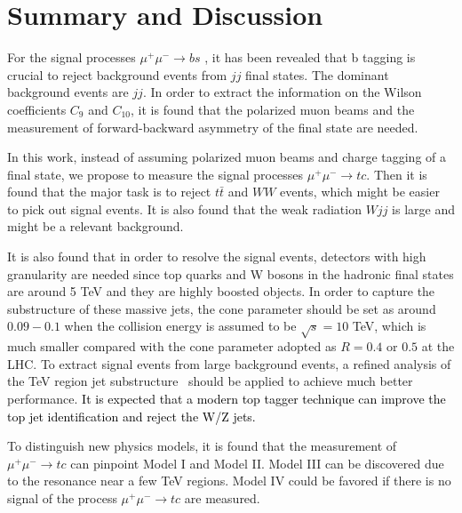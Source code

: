 \documentclass[a4paper,11pt]{article}
\begin{document}
\section{Summary and Discussion}\label{Sec:conc}
For the signal processes $\mu^+ \mu^- \to b s$ \cite{Altmannshofer:2022xri}, it has been revealed that b tagging is crucial to reject background events from $jj$ final states. The dominant background events are $j j$. In order to extract the information on the Wilson coefficients $C_{9}$ and $C_{10}$, it is found that the polarized muon beams and the measurement of forward-backward asymmetry of the final state are needed. 

In this work, instead of assuming polarized muon beams and charge tagging of a final state, we propose to measure the signal processes $\mu^+ \mu^- \to t c$. Then it is found that the major task is to reject $t \bar{t}$ and $ W W$ events, which might be easier to pick out signal events. It is also found that the weak radiation $W j j $ is large and might be a relevant background.

It is also found that in order to resolve the signal events, 
detectors with high granularity are needed since top quarks and W bosons in the hadronic final states are around 5 TeV and they are highly boosted objects. 
In order to capture the substructure of these massive jets, 
the cone parameter should be set as around  $0.09-0.1$ when the collision energy is assumed to be $\sqrt{s}=10$ TeV, 
which is much smaller compared with the cone parameter adopted as $R=0.4$ or $0.5$ at the LHC. 
To extract signal events from large background events, 
a refined analysis of the TeV region jet substructure~\cite{Butterworth:2008iy,Kaplan:2008ie,Kilian:2021whd} should be applied to achieve much better performance. 
\textcolor{black}{It is expected that a modern top tagger technique can improve the top jet identification and reject the W/Z jets.}


To distinguish new physics models, it is found that the measurement of  $\mu^+ \mu^- \to tc$ can pinpoint Model I and Model II. Model III can be discovered due to the resonance near a few TeV regions. Model IV could be favored if there is no signal of the process $\mu^+ \mu^- \to t c$ are measured.
\end{document}
